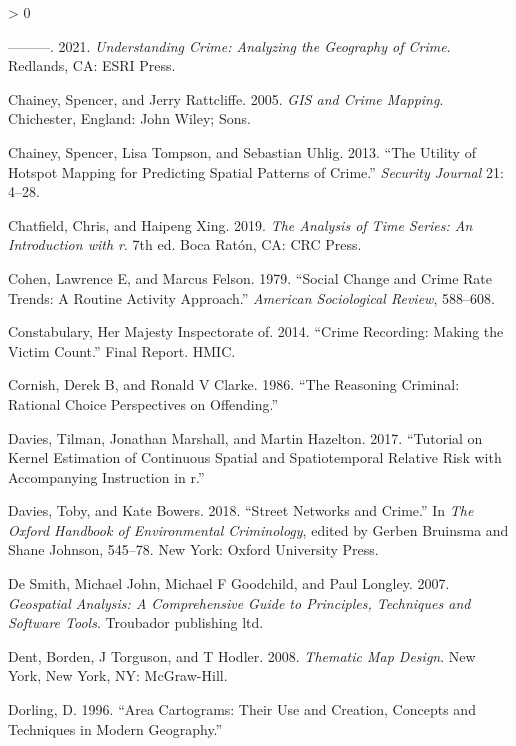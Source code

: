 \documentclass[
  krantz2]{krantz}
\newlength{\cslhangindent}
\newenvironment{CSLReferences}[2] %
 {%
  \setlength{\parindent}{0pt}
  \ifodd #1 \everypar{\setlength{\hangindent}{\cslhangindent}}\ignorespaces\fi
  \ifnum #2 > 0
  \setlength{\parskip}{#2\baselineskip}
  \fi
 }%
 {}
\begin{document}
\begin{CSLReferences}{1}{0}
\leavevmode\hypertarget{ref-Chainey_2021}{}%
---------. 2021. \emph{Understanding Crime: Analyzing the Geography of Crime}. Redlands, CA: ESRI Press.

\leavevmode\hypertarget{ref-Chainey_2005}{}%
Chainey, Spencer, and Jerry Rattcliffe. 2005. \emph{GIS and Crime Mapping}. Chichester, England: John Wiley; Sons.

\leavevmode\hypertarget{ref-Chainey_2008}{}%
Chainey, Spencer, Lisa Tompson, and Sebastian Uhlig. 2013. {``The Utility of Hotspot Mapping for Predicting Spatial Patterns of Crime.''} \emph{Security Journal} 21: 4--28.

\leavevmode\hypertarget{ref-Chatfield_2019}{}%
Chatfield, Chris, and Haipeng Xing. 2019. \emph{The Analysis of Time Series: An Introduction with r}. 7th ed. Boca Ratón, CA: CRC Press.

\leavevmode\hypertarget{ref-Cohen_1979}{}%
Cohen, Lawrence E, and Marcus Felson. 1979. {``Social Change and Crime Rate Trends: A Routine Activity Approach.''} \emph{American Sociological Review}, 588--608.

\leavevmode\hypertarget{ref-HMIC_2014}{}%
Constabulary, Her Majesty Inspectorate of. 2014. {``Crime Recording: Making the Victim Count.''} Final Report. HMIC.

\leavevmode\hypertarget{ref-Cornish_1986}{}%
Cornish, Derek B, and Ronald V Clarke. 1986. {``The Reasoning Criminal: Rational Choice Perspectives on Offending.''}

\leavevmode\hypertarget{ref-Davies_2017}{}%
Davies, Tilman, Jonathan Marshall, and Martin Hazelton. 2017. {``Tutorial on Kernel Estimation of Continuous Spatial and Spatiotemporal Relative Risk with Accompanying Instruction in r.''}

\leavevmode\hypertarget{ref-Davies_2018}{}%
Davies, Toby, and Kate Bowers. 2018. {``Street Networks and Crime.''} In \emph{The Oxford Handbook of Environmental Criminology}, edited by Gerben Bruinsma and Shane Johnson, 545--78. New York: Oxford University Press.

\leavevmode\hypertarget{ref-DeSmith_2007}{}%
De Smith, Michael John, Michael F Goodchild, and Paul Longley. 2007. \emph{Geospatial Analysis: A Comprehensive Guide to Principles, Techniques and Software Tools}. Troubador publishing ltd.

\leavevmode\hypertarget{ref-Dent_2008}{}%
Dent, Borden, J Torguson, and T Hodler. 2008. \emph{Thematic Map Design}. New York, New York, NY: McGraw-Hill.

\leavevmode\hypertarget{ref-Dorling_1996}{}%
Dorling, D. 1996. {``Area Cartograms: Their Use and Creation, Concepts and Techniques in Modern Geography.''}


\end{CSLReferences}
\end{document}
